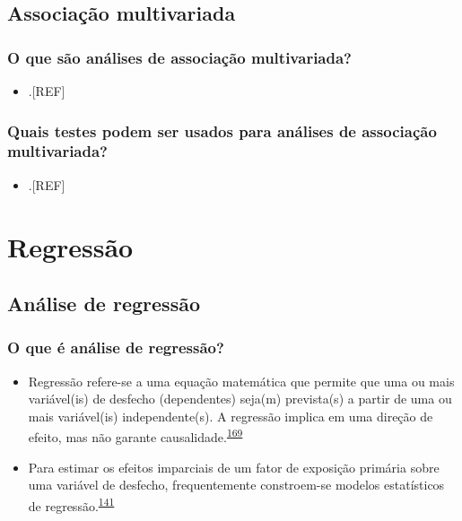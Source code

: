 \documentclass[
  a4paper,
]{book}
\providecommand{\tightlist}{%
  \setlength{\itemsep}{0pt}\setlength{\parskip}{0pt}}
\begin{document}
\hypertarget{multivariada}{%
\section{Associação multivariada}\label{multivariada}}

\hypertarget{o-que-suxe3o-anuxe1lises-de-associauxe7uxe3o-multivariada}{%
\subsection{O que são análises de associação multivariada?}\label{o-que-suxe3o-anuxe1lises-de-associauxe7uxe3o-multivariada}}

\begin{itemize}
\tightlist
\item
  .{[}REF{]}
\end{itemize}

\hypertarget{quais-testes-podem-ser-usados-para-anuxe1lises-de-associauxe7uxe3o-multivariada}{%
\subsection{Quais testes podem ser usados para análises de associação multivariada?}\label{quais-testes-podem-ser-usados-para-anuxe1lises-de-associauxe7uxe3o-multivariada}}

\begin{itemize}
\tightlist
\item
  .{[}REF{]}
\end{itemize}

\hypertarget{analise-inferencial-regressao}{%
\chapter{\texorpdfstring{\textbf{Regressão}}{Regressão}}\label{analise-inferencial-regressao}}

\hypertarget{analise-regressao}{%
\section{Análise de regressão}\label{analise-regressao}}

\hypertarget{o-que-uxe9-anuxe1lise-de-regressuxe3o}{%
\subsection{O que é análise de regressão?}\label{o-que-uxe9-anuxe1lise-de-regressuxe3o}}

\begin{itemize}
\item
  Regressão refere-se a uma equação matemática que permite que uma ou mais variável(is) de desfecho (dependentes) seja(m) prevista(s) a partir de uma ou mais variável(is) independente(s). A regressão implica em uma direção de efeito, mas não garante causalidade.\textsuperscript{\protect\hyperlink{ref-greenhalgh1997a}{169}}
\item
  Para estimar os efeitos imparciais de um fator de exposição primária sobre uma variável de desfecho, frequentemente constroem-se modelos estatísticos de regressão.\textsuperscript{\protect\hyperlink{ref-bandoli2018}{141}}
\end{itemize}
\end{document}
